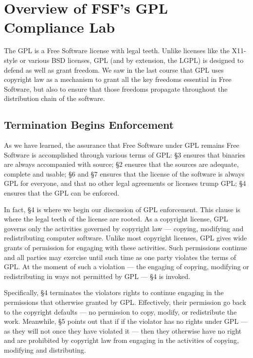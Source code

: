 \documentclass[12pt]{report}
\begin{document}
\tableofcontents

\pagebreak


\chapter{Overview of FSF's GPL Compliance Lab}

The GPL is a Free Software license with legal teeth.  Unlike licenses like
the X11-style or various BSD licenses, GPL (and by extension, the LGPL) is
designed to defend as well as grant freedom.  We saw in the last course
that GPL uses copyright law as a mechanism to grant all the key freedoms
essential in Free Software, but also to ensure that those freedoms
propagate throughout the distribution chain of the software.

\section{Termination Begins Enforcement}

As we have learned, the assurance that Free Software under GPL remains
Free Software is accomplished through various terms of GPL: \S 3 ensures
that binaries are always accompanied with source; \S 2 ensures that the
sources are adequate, complete and usable; \S 6 and \S 7 ensures that the
license of the software is always GPL for everyone, and that no other
legal agreements or licenses trump GPL; \S 4 ensures that the GPL can be
enforced.

In fact, \S 4 is where we begin our discussion of GPL enforcement.  This
clause is where the legal teeth of the license are rooted.  As a copyright
license, GPL governs only the activities governed by copyright law ---
copying, modifying and redistributing computer software.  Unlike most
copyright licenses, GPL gives wide grants of permission for engaging with
these activities.  Such permissions continue and all parties may exercise
until such time as one party violates the terms of GPL\@.  At the moment
of such a violation --- the engaging of copying, modifying or
redistributing in ways not permitted by GPL --- \S 4 is invoked.

Specifically, \S 4 terminates the violators rights to continue engaging
in the permissions that otherwise granted by GPL\@.  Effectively, their
permission go back to the copyright defaults --- no permission to copy,
modify, or redistribute the work.  Meanwhile, \S 5 points out that if
if the violator has no rights under GPL --- as they will not once they
have violated it --- then they otherwise have no right and are prohibited
by copyright law from engaging in the activities of copying, modifying
and distributing.
\end{document}
